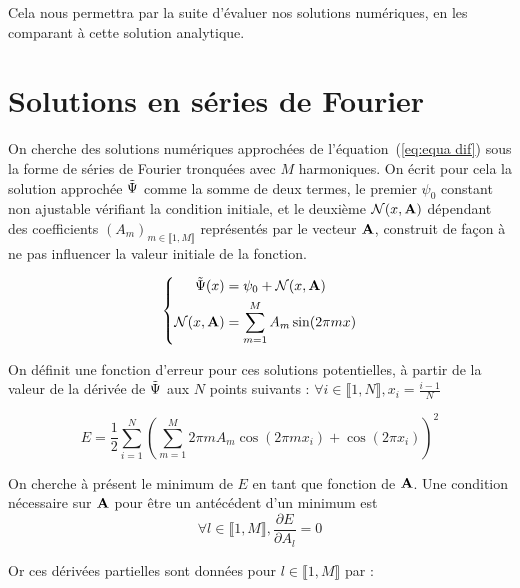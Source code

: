 \documentclass[12pt]{report}
\begin{document}
Cela nous permettra par la suite d'évaluer nos solutions numériques, en les comparant à cette solution analytique.


\section{Solutions en séries de Fourier}

On cherche des solutions numériques approchées de l'équation~(\ref{eq:equa dif}) sous la forme de séries de Fourier tronquées avec $M$ harmoniques.
On écrit pour cela la solution approchée $\Tilde{\Psi}$ comme la somme de deux termes, le premier $\psi_0$ constant non ajustable vérifiant la condition initiale, et 
le deuxième $\mathcal{N}(x,\bf{A})$ dépendant des coefficients $(A_m)_{m\in \llbracket 1,M \rrbracket}$ représentés par le vecteur $\bf{A}$, construit de façon à ne pas influencer la valeur initiale de la fonction.

\begin{equation}
\left\{
    \begin{aligned}
        \Tilde{\Psi}(x) &= \psi_0 + {\mathcal{N}}(x,\bf{A}) \\
        {\mathcal{N}}(x,\bf{A}) &= \sum_{m=1}^{M} A_m \sin(2\pi m x) 
    \end{aligned}
\right.
\label{eq:solution Fourier}
\end{equation}




On définit une fonction d'erreur pour ces solutions potentielles, à partir de la valeur de la dérivée de $\Tilde{\Psi}$ aux $N$ points suivants : $\forall i \in\llbracket 1,N \rrbracket, x_i = \frac{i-1}{N} $

\begin{equation}
    E = \frac{1}{2}\sum_{i=1}^{N}(\sum_{m=1}^{M} 2\pi m A_m \cos(2\pi m x_i)+\cos(2\pi x_i))^2 
\label{eq:fonction d'erreur}
\end{equation}

On cherche à présent le minimum de $E$ en tant que fonction de $\bf{A}$. Une condition nécessaire sur $\bf{A}$ pour être un antécédent d'un minimum
est 
\begin{equation}
    {\forall l \in\llbracket 1,M \rrbracket, \frac{\partial E}{\partial A_l} = 0}
    \label{eq:condition nécessaire A_l}
\end{equation}

Or ces dérivées partielles sont données pour $l \in \llbracket 1,M \rrbracket$ par :
\end{document}

